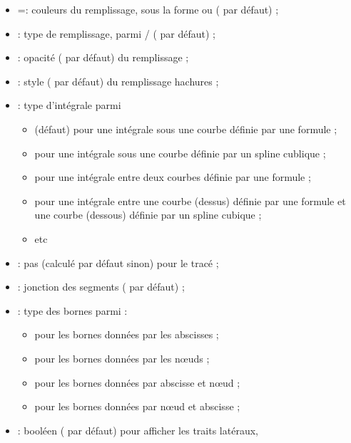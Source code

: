 \documentclass[11pt,a4paper]{ltxdoc}
\begin{document}
\begin{itemize}
	\item {} =: couleurs du remplissage, sous la forme  ou  ( par défaut) ;
	\item {} : type de remplissage, parmi / ( par défaut) ;
	\item {} : opacité ( par défaut) du remplissage ;
	\item {} : style ( par défaut) du remplissage hachures ;
	\item {} : type d'intégrale parmi
	\begin{itemize}
		\item {} (défaut) pour une intégrale sous une courbe définie par une formule ;
		\item {} pour une intégrale sous une courbe définie par un spline cublique ;
		\item {} pour une intégrale entre deux courbes définie par une formule ;
		\item {} pour une intégrale entre une courbe (dessus) définie par une formule et une courbe (dessous) définie par un spline cubique ;
		\item etc
	\end{itemize}
	\item {} : pas (calculé par défaut sinon) pour le tracé ;
	\item {} : jonction des segments ( par défaut) ;
	\item {} : type des bornes parmi :
	\begin{itemize}
		\item {} pour les bornes données par les abscisses ;
		\item {} pour les bornes données par les nœuds ;
		\item {} pour les bornes données par abscisse et nœud ;
		\item {} pour les bornes données par nœud et abscisse ;
	\end{itemize}
	\item {} : booléen ( par défaut) pour afficher les traits latéraux,%

\end{itemize}
\end{document}

